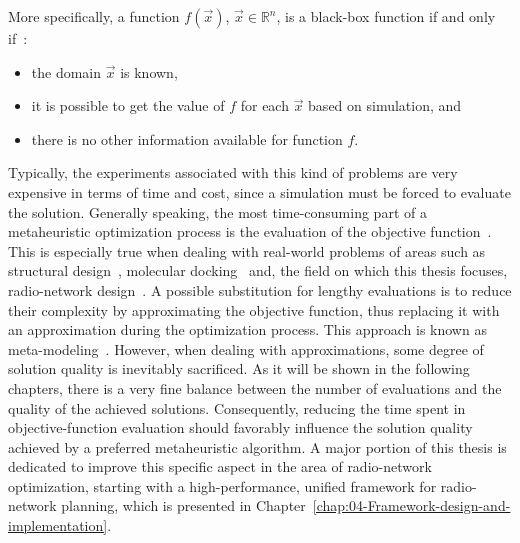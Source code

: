 More specifically, a function $f(\vec{x})$, $\vec{x}\in\mathbb{R}^{n}$,
is a black-box function if and only if~\cite{Talbi_Metaheuristics:2009}:
\begin{itemize}
\item the domain $\vec{x}$ is known,
\item it is possible to get the value of $f$ for each $\vec{x}$ based
on simulation, and
\item there is no other information available for function $f$.
\end{itemize}
Typically, the experiments associated with this kind of problems are
very expensive in terms of time and cost, since a simulation must
be forced to evaluate the solution. Generally speaking, the most time-consuming
part of a metaheuristic optimization process is the evaluation of
the objective function~\cite{Talbi_Metaheuristics:2009}. This is
especially true when dealing with real-world problems of areas such
as structural design~\cite{Barthelemy-Approximation_concepts_for_optimum_structural_design:1993},
molecular docking~\cite{Tantar-A_parallel_hybrid_genetic_algorithm_for_protein_structure_prediction:2007}
and, the field on which this thesis focuses, radio-network design~\cite{Benedicic_Pilot.power.optimization:2010,Benedicic_Balancing_downlink_uplink_soft_handover_areas_in_UMTS_networks:2012,Benedicic-A_GPU_based_parallel_agent_optimization_approach:2013,Benedicic-A_GRASS_GIS_parallel_module_for_radio-propagation_predictions:2013,Benedicic-An_adaptable_parallel_simulation_framework_for_LTE_coverage_planning:2013}.
A possible substitution for lengthy evaluations is to reduce their
complexity by approximating the objective function, thus replacing
it with an approximation during the optimization process. This approach
is known as meta-modeling~\cite{Talbi_Metaheuristics:2009}. However,
when dealing with approximations, some degree of solution quality
is inevitably sacrificed. As it will be shown in the following chapters,
there is a very fine balance between the number of evaluations and
the quality of the achieved solutions. Consequently, reducing the
time spent in objective-function evaluation should favorably influence
the solution quality achieved by a preferred metaheuristic algorithm.
A major portion of this thesis is dedicated to improve this specific
aspect in the area of radio-network optimization, starting with a
high-performance, unified framework for radio-network planning, which
is presented in Chapter~\ref{chap:04-Framework-design-and-implementation}.

